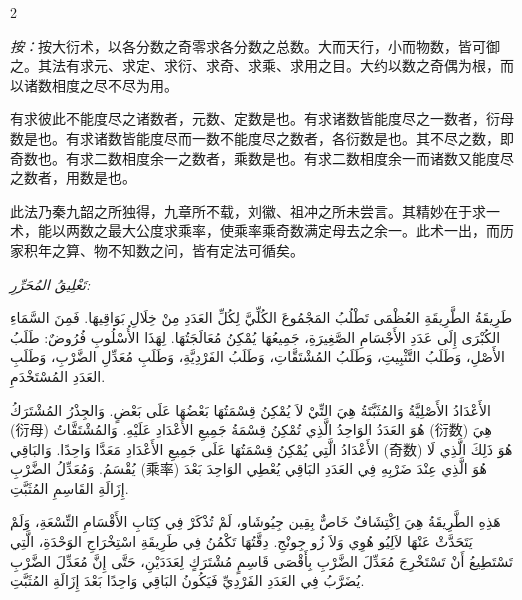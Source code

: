 \documentclass[11pt,a4paper]{article}
\newcommand{\ar}[1]{\arabicfont\beginR #1\endR}
\newenvironment{bilingual}{%
  \begin{paracol}{2}
}{%
  \end{paracol}
}
\begin{document}
\begin{bilingual}

\begin{leftcolumn*}
\textit{按：}按大衍术，以各分数之奇零求各分数之总数。大而天行，小而物数，皆可御之。其法有求元、求定、求衍、求奇、求乘、求用之目。大约以数之奇偶为根，而以诸数相度之尽不尽为用。

有求彼此不能度尽之诸数者，元数、定数是也。有求诸数皆能度尽之一数者，衍母数是也。有求诸数皆能度尽而一数不能度尽之数者，各衍数是也。其不尽之数，即奇数也。有求二数相度余一之数者，乘数是也。有求二数相度余一而诸数又能度尽之数者，用数是也。

此法乃秦九韶之所独得，九章所不载，刘徽、祖冲之所未尝言。其精妙在于求一术，能以两数之最大公度求乘率，使乘率乘奇数满定母去之余一。此术一出，而历家积年之算、物不知数之问，皆有定法可循矣。
\end{leftcolumn*}

\begin{rightcolumn*}
\ar{\textit{تَعْلِيقُ المُحَرِّرِ:}}

\ar{طَرِيقَةُ الطَّرِيقَةِ العُظْمَى تَطْلُبُ المَجْمُوعَ الكُلِّيَّ لِكُلِّ العَدَدِ مِنْ خِلَالِ بَوَاقِيهَا. فَمِنَ السَّمَاءِ الكُبْرَى إِلَى عَدَدِ الأَجْسَامِ الصَّغِيرَةِ، جَمِيعُهَا يُمْكِنُ مُعَالَجَتُهَا. لِهَذَا الأُسْلُوبِ فُرُوضٌ: طَلَبُ الأَصْلِ، وَطَلَبُ التَّثْبِيتِ، وَطَلَبُ المُشْتَقَّاتِ، وَطَلَبُ الفَرْدِيَّةِ، وَطَلَبِ مُعَدِّلِ الضَّرْبِ، وَطَلَبِ العَدَدِ المُسْتَخْدَمِ.}

\ar{الأَعْدَادُ الأَصْلِيَّةُ وَالمُثَبَّتَةُ هِيَ التِّيْ لاَ يُمْكِنُ قِسْمَتُهَا بَعْضُهَا عَلَى بَعْضٍ. وَالجِذْرُ المُشْتَرَكُ (衍母) هُوَ العَدَدُ الوَاحِدُ الَّذِي تُمْكِنُ قِسْمَةُ جَمِيعِ الأَعْدَادِ عَلَيْهِ. وَالمُشْتَقَّاتُ (衍数) هِيَ الأَعْدَادُ الَّتِي يُمْكِنُ قِسْمَتُهَا عَلَى جَمِيعِ الأَعْدَادِ مَعَدَّا وَاحِدًا. وَالبَاقِي (奇数) هُوَ ذَلِكَ الَّذِي لَا يُقْسَمُ. وَمُعَدِّلُ الضَّرْبِ (乘率) هُوَ الَّذِي عِنْدَ ضَرْبِهِ فِي العَدَدِ البَاقِي يُعْطِي الوَاحِدَ بَعْدَ إِزَالَةِ القَاسِمِ المُثَبَّتِ.}

\ar{هَذِهِ الطَّرِيقَةُ هِيَ اِكْتِشَافٌ خَاصٌّ بِقِين جِيُوشَاو، لَمْ تُذْكَرْ فِي كِتَابِ الأَقْسَامِ التِّسْعَةِ، وَلَمْ يَتَحَدَّثْ عَنْهَا لاَلِيُو هُوِي وَلاَ زُو جِونْجِ. دِقَّتُهَا تَكْمُنُ فِي طَرِيقَةِ اسْتِخْرَاجِ الوَحْدَةِ، الَّتِي تَسْتَطِيعُ أَنْ تَسْتَخْرِجَ مُعَدِّلَ الضَّرْبِ بِأَقْصَى قَاسِمٍ مُشْتَرَكٍ لِعَدَدَيْنِ، حَتَّى إِنَّ مُعَدِّلَ الضَّرْبِ يُضَرَّبُ فِي العَدَدِ الفَرْدِيِّ فَيَكُونُ البَاقِي وَاحِدًا بَعْدَ إِزَالَةِ المُثَبَّتِ.}
\end{rightcolumn*}

\end{bilingual}
\end{document}
